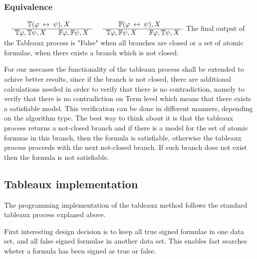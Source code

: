 \documentclass{article}
\begin{document}
		\subsubsection*{Equivalence}
			$\begin{array}{rl}
				& \:\:\:\:\:\:\:\: \mathbb{T}(\varphi \: \leftrightarrow \: \psi), X \\
			      \cline{2-2}
			      & \mathbb{T}\varphi, \mathbb{T}\psi, X \:\:\:\:\:\:\:\: \mathbb{F}\varphi, \mathbb{F}\psi, X
			\end{array}$
			\:\:\:\:\:\:\:\:\:\:
			$\begin{array}{rl}
				& \:\:\:\:\:\:\:\: \mathbb{F}(\varphi \: \leftrightarrow \: \psi), X \\
			      \cline{2-2}
			      & \mathbb{T}\varphi, \mathbb{F}\psi, X \:\:\:\:\:\:\:\: \mathbb{F}\varphi, \mathbb{T}\psi, X
			\end{array}$
		\newline
		\newline
		\newline
		The final output of the Tableaux process is "False" when all branches are closed or a set of atomic formulae, when there exists a branch which is not closed.
		\newline
	
		For our usecases the functionality of the tableaux process shall be extended to achive better results, since if the branch is not closed, there are 
		additional calculations needed in order to verify that there is no contradiction, namely to verify that there is no contradiction on Term level which means 
		that there exists a satisfiable model.
		This verification can be done in different manners, depending on the algorithm type. The best way to think about it is that the tableaux process returns a 
		not-closed branch and if there is a model for the set of atomic formuas in this branch, then the formula is satisfiable, otherwise the tableaux process proceeds 
		with the next not-closed branch. If such branch does not exist then the formula is not satisfiable. 

	\subsection{Tableaux implementation}
		The programming implementation of the tableaux method follows the standard tableaux process explaned above.

		First interesting design decision is to keep all true signed formulae in one data set, and all false signed formulae in another data set.
		This enables fast searches wheter a formula has been signed as true or false.
		
\end{document}
